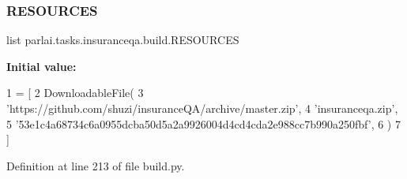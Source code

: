 \subsubsection{\texorpdfstring{R\+E\+S\+O\+U\+R\+C\+ES}{RESOURCES}}
{\footnotesize\ttfamily list parlai.\+tasks.\+insuranceqa.\+build.\+R\+E\+S\+O\+U\+R\+C\+ES}

{\bfseries Initial value\+:}
\begin{DoxyCode}
1 =  [
2     DownloadableFile(
3         \textcolor{stringliteral}{'https://github.com/shuzi/insuranceQA/archive/master.zip'},
4         \textcolor{stringliteral}{'insuranceqa.zip'},
5         \textcolor{stringliteral}{'53e1c4a68734c6a0955dcba50d5a2a9926004d4cd4cda2e988cc7b990a250fbf'},
6     )
7 ]
\end{DoxyCode}


Definition at line 213 of file build.\+py.

